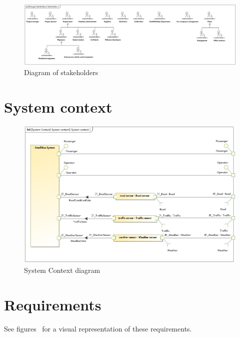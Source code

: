 \documentclass[a4paper]{article}
\begin{document}
\begin{figure}
	\centering
	\includegraphics[width=\textwidth]{stakeholders.jpg} %
	\caption{Diagram of stakeholders}%
	\label{fig:stakeholders}
\end{figure}



\section{System context}

\begin{figure}[H]
	\centering
	\includegraphics[width=\textwidth]{context.jpg}
	\caption{System Context diagram}
\end{figure}


\section{Requirements}

See figures~ for a visual
representation of these requirements.
\end{document}
